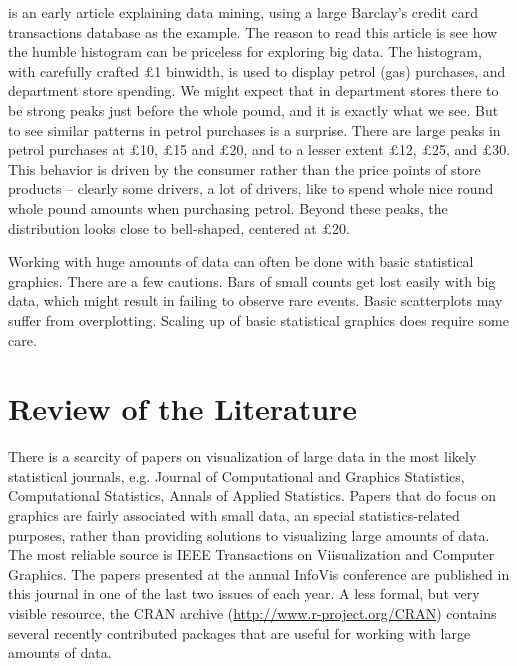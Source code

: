 \documentclass{article}
\begin{document}
\citet{hand2000} is an early article explaining data mining, using a large Barclay's credit card transactions database as the example. The reason to read this article is see how the humble histogram can be priceless for exploring big data. The histogram, with carefully crafted $\pounds$1 binwidth, is used to display petrol (gas) purchases, and department store spending. We might expect that in department stores there to be strong peaks just before the whole pound, and it is exactly what we see. But to see similar patterns in petrol purchases is a surprise. There are large peaks in petrol purchases at $\pounds$10, $\pounds$15 and $\pounds$20, and to a lesser extent $\pounds$12, $\pounds$25, and $\pounds$30. This behavior is driven by the consumer rather than the price points of store products -- clearly some drivers, a lot of drivers, like to spend whole nice round whole pound amounts when purchasing petrol. Beyond these peaks, the distribution looks close to bell-shaped, centered at $\pounds$20.

Working with huge amounts of data can often be done with basic statistical graphics. There are a few cautions. Bars of small counts get lost easily with big data, which might result in failing to observe rare events. Basic scatterplots may suffer from overplotting.  Scaling up of basic statistical graphics does require some care.

\section{Review of the Literature}

There is a scarcity of papers on visualization of large data in the most likely statistical journals, e.g. Journal of Computational and Graphics Statistics, Computational Statistics, Annals of Applied Statistics. Papers that do focus on graphics are fairly associated with small data, an special statistics-related purposes, rather than providing solutions to visualizing large amounts of data. The most reliable source is IEEE Transactions on Viisualization and Computer Graphics. The papers presented at the annual InfoVis conference are published in this journal in one of the last two issues of each year. A less formal, but very visible resource, the CRAN archive (\url{http://www.r-project.org/CRAN}) contains several recently contributed packages that are useful for working with large amounts of data.
\end{document}
